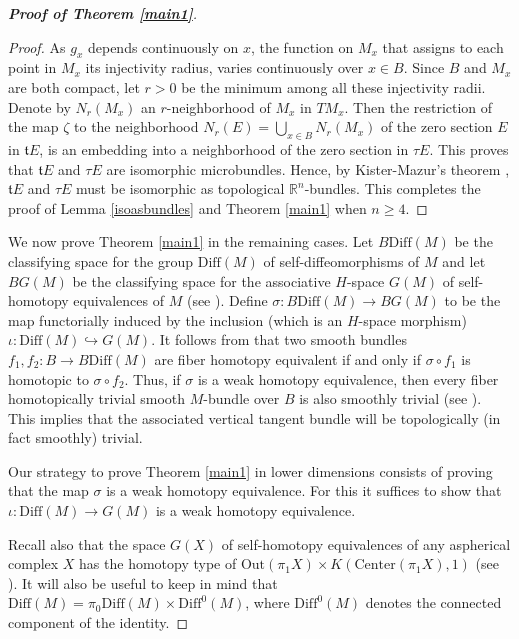 \documentclass[onecolumn,notitlepage,11pt]{article}
\newcommand{\refer}[1]{\hyperref[#1]{\ref*{#1}}}%
\newcommand{\R}{\mathbb{R}}
\theoremstyle{definition}
\begin{document}
\begin{proof}[\textbf{Proof of Theorem \refer{main1}}]
\begin{proof}
As $g_x$ depends
continuously on $x$, the function on $M_x$
that assigns to each point 
in $M_x$ its injectivity
radius, varies continuously over $x\in B$.
Since $B$ and $M_x$ are both
compact, let $r>0$ be the minimum among all these injectivity radii.
Denote by $N_r(M_x)$ an $r$-neighborhood of 
$M_x$ in $TM_x$. Then the restriction of
the map $\zeta$ to 
the neighborhood $N_r(E)=\bigcup_{x\in B} N_r(M_x)$ of 
the zero section $E$ in $\mathfrak{t}E$, 
is an embedding into a neighborhood of the zero section in $\tau E$.
This proves that $\mathfrak{t}E$ and $\tau E$ are isomorphic
microbundles. Hence, by Kister-Mazur's theorem
\cite[Theorem 2]{kister}, $\mathfrak{t}E$ and $\tau E$ must be 
isomorphic as topological $\R^n$-bundles. 
This completes the proof of Lemma 
\ref{isoasbundles} and Theorem \ref{main1} when $n\geq 4$.
\end{proof}

We now prove Theorem \ref{main1} in the remaining cases.
Let $B\mbox{Diff}(M)$ be the classifying space for the group
$\mbox{Diff}(M)$ of 
self-diffeomorphisms of $M$  and let $BG(M)$ 
be the classifying space for 
the associative $H$-space $G(M)$ of self-homotopy equivalences of $M$
(see \cite{dold}). Define $\sigma:B\mbox{Diff}(M)\to BG(M)$ to be the map
functorially induced by the inclusion (which
is an $H$-space morphism) $\iota:\mbox{Diff}(M)\hookrightarrow G(M)$.
It follows from \cite{dold} that two smooth bundles
$f_1,f_2:B\to B\mbox{Diff}(M)$ are fiber homotopy equivalent if and only if
$\sigma\circ f_1$ is homotopic to $\sigma\circ f_2$. Thus, if $\sigma$
is a weak homotopy equivalence, then
every fiber homotopically trivial
smooth $M$-bundle over $B$ is also smoothly trivial (see 
\cite[Proposition 4.22]{hatcher}). This implies 
that the associated vertical
tangent bundle will be topologically (in fact smoothly) trivial.

Our strategy to prove Theorem \ref{main1} in lower dimensions consists of 
proving that the map $\sigma$ is a weak homotopy equivalence. For this
it suffices to show that $\iota:\mbox{Diff}(M)\to G(M)$ 
is a weak homotopy equivalence. 

Recall also that the space $G(X)$ of self-homotopy equivalences of any
aspherical complex $X$ has the homotopy type of
$\mbox{Out}(\pi_1X)\times K(\mbox{Center}(\pi_1X),1)$ 
(see \cite{G(X)}). It will also be
useful to keep in mind that $\mbox{Diff}(M)=\pi_0\mbox{Diff}(M)\times \mbox{Diff}^0(M)$, where 
$\mbox{Diff}^0(M)$ denotes the connected component of the identity.


\end{proof}
\end{document}
